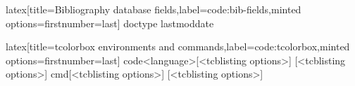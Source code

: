 %
\begin{code}{latex}[title={Bibliography database fields},label=code:bib-fields,minted options={firstnumber=last}]
doctype
lastmoddate
\end{code}
%
\begin{code}{latex}[title={tcolorbox environments and commands},label=code:tcolorbox,minted options={firstnumber=last}]
{code}{<language>}[<tcblisting options>]
[<tcblisting options>]
{cmd}[<tcblisting options>]
[<tcblisting options>]
\end{code}

\begin{comment}

\clearpage
\subsection{subsection 1}

\section{Test appendix 2}

\section{Test appendix 3}
\clearpage
\subsection{subsection 1}
\clearpage
\subsection{subsection 2}
\clearpage

\end{comment}
